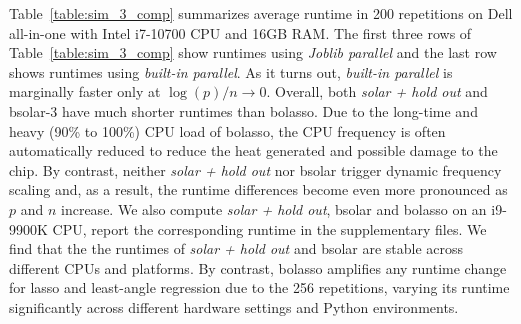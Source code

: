 \documentclass[12pt]{article}
\begin{document}
Table~\ref{table:sim_3_comp} summarizes average runtime in 200 repetitions on Dell all-in-one with Intel i7-10700 CPU and 16GB RAM. The first three rows of Table~\ref{table:sim_3_comp} show runtimes using \emph{Joblib parallel} and the last row shows runtimes using \emph{built-in parallel}. As it turns out, \emph{built-in parallel} is marginally faster only at $\log(p)/n \rightarrow 0$. Overall, both \emph{solar + hold out} and bsolar-3 have much shorter runtimes than bolasso. Due to the long-time and heavy (90\% to 100\%) CPU load of bolasso, the CPU frequency is often automatically reduced to reduce the heat generated and possible damage to the chip. By contrast, neither \emph{solar + hold out} nor bsolar trigger dynamic frequency scaling and, as a result, the runtime differences become even more pronounced as $p$ and $n$ increase. We also compute \emph{solar + hold out}, bsolar and bolasso on an i9-9900K CPU, report the corresponding runtime in the supplementary files. We find that the the runtimes of \emph{solar + hold out} and bsolar are stable across different CPUs and platforms. By contrast, bolasso amplifies any runtime change for lasso and least-angle regression due to the 256 repetitions, varying its runtime significantly across different hardware settings and Python environments. 
\end{document}
